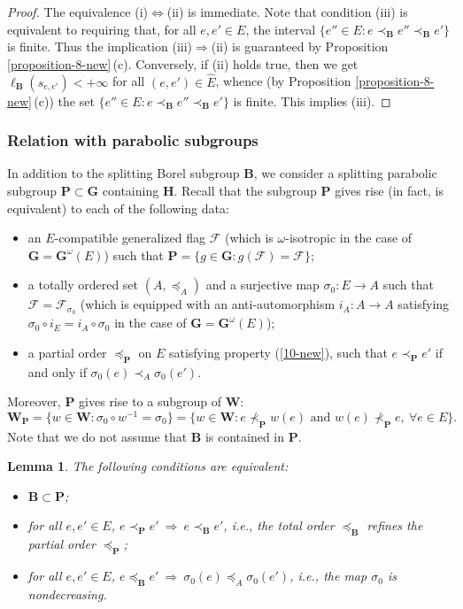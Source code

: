 \documentclass[12pt]{amsart}
\newtheorem{lemma}{Lemma}
\theoremstyle{definition}
\begin{document}
\begin{proof}
The equivalence {\rm (i)}$\Leftrightarrow${\rm (ii)} is immediate.
Note that condition {\rm (iii)} is equivalent to requiring that,
for all $e,e'\in E$, the interval $\{e''\in E:e\prec_\mathbf{B}e''\prec_\mathbf{B}e'\}$ is finite.
Thus the implication {\rm (iii)}$\Rightarrow${\rm (ii)} is guaranteed by Proposition \ref{proposition-8-new}\,{\rm (c)}. Conversely, if {\rm (ii)} holds true, then we get $\ell_\mathbf{B}(s_{e,e'})<+\infty$ for all $(e,e')\in \hat{E}$, whence (by Proposition \ref{proposition-8-new}\,{\rm (c)}) the set $\{e''\in E:e\prec_\mathbf{B}e''\prec_\mathbf{B}e'\}$ is finite.
This implies {\rm (iii)}.
\end{proof}

\subsubsection{Relation with parabolic subgroups}
In addition to the splitting Borel subgroup $\mathbf{B}$, we consider a splitting parabolic subgroup $\mathbf{P}\subset\mathbf{G}$ containing $\mathbf{H}$. Recall that the subgroup $\mathbf{P}$ gives rise (in fact, is equivalent) to each of the following data:
\begin{itemize}
\item an $E$-compatible generalized flag $\mathcal{F}$ (which is $\omega$-isotropic in the case of $\mathbf{G}=\mathbf{G}^\omega(E)$) such that $\mathbf{P}=\{g\in \mathbf{G}:g(\mathcal{F})=\mathcal{F}\}$;
\item a totally ordered set $(A,\preceq_A)$ and a surjective map $\sigma_0:E\to A$ such that $\mathcal{F}=\mathcal{F}_{\sigma_0}$ (which is equipped with an anti-automorphism $i_A:A\to A$ satisfying $\sigma_0\circ i_E=i_A\circ\sigma_0$ in the case of $\mathbf{G}=\mathbf{G}^\omega(E)$);
\item a partial order $\preceq_\mathbf{P}$ on $E$ satisfying property (\ref{10-new}), such that $e\prec_\mathbf{P}e'$ if and only if $\sigma_0(e)\prec_A\sigma_0(e')$.
\end{itemize}
Moreover, $\mathbf{P}$ gives rise to a subgroup of $\mathbf{W}$:
\[\mathbf{W}_\mathbf{P}=\{w\in\mathbf{W}:\sigma_0\circ w^{-1}=\sigma_0\}=\{w\in\mathbf{W}:e\not\prec_\mathbf{P}w(e)\mbox{ and }w(e)\not\prec_\mathbf{P}e,\ \forall e\in E\}.\]
Note that we do not assume that $\mathbf{B}$ is contained in $\mathbf{P}$.

\begin{lemma}
\label{lemma-4-new}
The following conditions are equivalent:
\begin{itemize}
\item[\rm (i)] $\mathbf{B}\subset\mathbf{P}$;
\item[\rm (ii)] for all $e,e'\in E$, $e\prec_\mathbf{P}e'\ \Rightarrow\ e\prec_\mathbf{B}e'$, i.e., the total order $\preceq_\mathbf{B}$ refines the partial order $\preceq_\mathbf{P}$;
\item[\rm (iii)] for all $e,e'\in E$, $e\preceq_\mathbf{B}e'\ \Rightarrow\ \sigma_0(e)\preceq_A\sigma_0(e')$,
i.e., the map $\sigma_0$ is nondecreasing.
\end{itemize}
\end{lemma}
\end{document}

